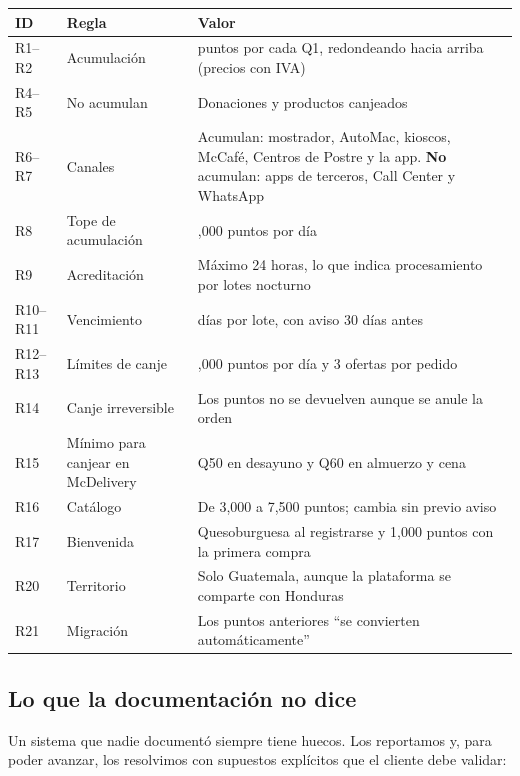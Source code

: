 \documentclass[12pt,a4paper]{article}
\begin{document}
\begin{center}
\renewcommand{\arraystretch}{1.35}
\begin{tabular}{|>{\raggedright\arraybackslash}p{1.6cm}|>{\raggedright\arraybackslash}p{3.8cm}|>{\raggedright\arraybackslash}p{8.2cm}|}
\hline
\textbf{ID} & \textbf{Regla} & \textbf{Valor} \\
\hline
R1--R2 & Acumulación & 10 puntos por cada Q1, redondeando hacia arriba (precios con IVA) \\
\hline
R4--R5 & No acumulan & Donaciones y productos canjeados \\
\hline
R6--R7 & Canales & Acumulan: mostrador, AutoMac, kioscos, McCafé, Centros de Postre y la app.
\textbf{No} acumulan: apps de terceros, Call Center y WhatsApp \\
\hline
R8 & Tope de acumulación & 1,000 puntos por día \\
\hline
R9 & Acreditación & Máximo 24 horas, lo que indica procesamiento por lotes nocturno \\
\hline
R10--R11 & Vencimiento & 365 días por lote, con aviso 30 días antes \\
\hline
R12--R13 & Límites de canje & 15,000 puntos por día y 3 ofertas por pedido \\
\hline
R14 & Canje irreversible & Los puntos no se devuelven aunque se anule la orden \\
\hline
R15 & Mínimo para canjear en McDelivery & Q50 en desayuno y Q60 en almuerzo y cena \\
\hline
R16 & Catálogo & De 3,000 a 7,500 puntos; cambia sin previo aviso \\
\hline
R17 & Bienvenida & Quesoburguesa al registrarse y 1,000 puntos con la primera compra \\
\hline
R20 & Territorio & Solo Guatemala, aunque la plataforma se comparte con Honduras \\
\hline
R21 & Migración & Los puntos anteriores ``se convierten automáticamente'' \\
\hline
\end{tabular}
\end{center}

\subsection{Lo que la documentación no dice}

Un sistema que nadie documentó siempre tiene huecos. Los reportamos y, para poder avanzar, los
resolvimos con supuestos explícitos que el cliente debe validar:
\end{document}
